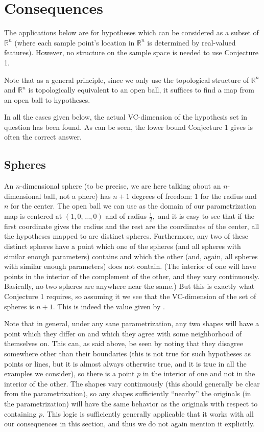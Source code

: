 \documentclass[12pt]{amsart}
\newcommand{\0}{\mat{0}}
\newcommand{\1}{\mathds{1}}
\begin{document}
\section{Consequences}
The applications below are for hypotheses which can be considered as a subset of $\mathbb{R}^n$ (where each sample point's location in $\mathbb{R}^n$ is determined by real-valued features). However, no structure on the sample space is needed to use Conjecture 1.

Note that as a general principle, since we only use the topological structure of $\mathbb{R}^n$ and $\mathbb{R}^n$ is topologically equivalent to an open ball, it suffices to find a map from an open ball to hypotheses.

In all the cases given below, the actual VC-dimension of the hypothesis set in question has been found. As can be seen, the lower bound Conjecture 1 gives is often the correct answer.

\subsection{Spheres}

An $n$-dimensional sphere (to be precise, we are here talking about an $n$-dimensional ball, not a phere) has $n + 1$ degrees of freedom: $1$ for the radius and $n$ for the center. The open ball we can use as the domain of our parametrization map is centered at $(1, 0, ..., 0)$ and of radius $\frac{1}{2},$ and it is easy to see that if the first coordinate gives the radius and the rest are the coordinates of the center, all the hypotheses mapped to are distinct spheres. Furthermore, any two of these distinct spheres have a point which one of the spheres (and all spheres with similar enough parameters) contains and which the other (and, again, all spheres with similar enough parameters) does not contain. (The interior of one will have points in the interior of the complement of the other, and they vary continuously. Basically, no two spheres are anywhere near the same.) But this is exactly what Conjecture 1 requires, so assuming it we see that the VC-dimension of the set of spheres is $n + 1.$ This is indeed the value given by \citep{spheres}.

Note that in general, under any sane parametrization, any two shapes will have a point which they differ on and which they agree with some neighborhood of themselves on. This can, as said above, be seen by noting that they disagree somewhere other than their boundaries (this is not true for such hypotheses as points or lines, but it is almost always otherwise true, and it is true in all the examples we consider), so there is a point $p$ in the interior of one and not in the interior of the other. The shapes vary continuously (this should generally be clear from the parametrization), so any shapes sufficiently ``nearby'' the originals (in the parametrization) will have the same behavior as the originals with respect to containing $p.$ This logic is sufficiently generally applicable that it works with all our consequences in this section, and thus we do not again mention it explicitly.
\end{document}
